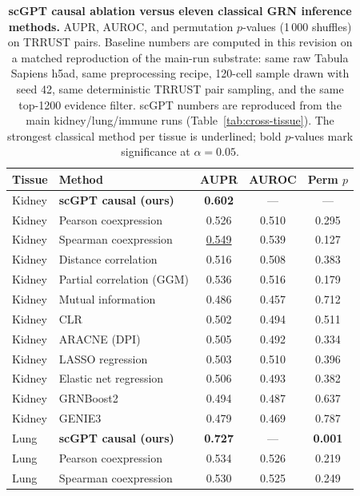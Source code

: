 \documentclass[10pt,letterpaper]{article}
\begin{document}
\begin{table}[!ht]
\centering
\caption{{\bf scGPT causal ablation versus eleven classical GRN inference
methods.}
AUPR, AUROC, and permutation $p$-values (1\,000 shuffles) on TRRUST
pairs. Baseline numbers are computed in this revision on a matched
reproduction of the main-run substrate: same raw Tabula Sapiens h5ad,
same preprocessing recipe, 120-cell sample drawn with seed 42, same
deterministic TRRUST pair sampling, and the same top-1200 evidence
filter. scGPT numbers are reproduced from the main kidney/lung/immune
runs (Table~\ref{tab:cross-tissue}). The strongest classical method per
tissue is underlined; bold $p$-values mark significance at
$\alpha{=}0.05$.}
\label{tab:grn-baselines}
\begin{tabular}{llccc}
\toprule
\textbf{Tissue} & \textbf{Method} & \textbf{AUPR} & \textbf{AUROC} & \textbf{Perm $p$} \\
\midrule
Kidney & \textbf{scGPT causal (ours)}     & \textbf{0.602} & ---   & ---   \\
Kidney & Pearson coexpression             & 0.526 & 0.510 & 0.295 \\
Kidney & Spearman coexpression            & \underline{0.549} & 0.539 & 0.127 \\
Kidney & Distance correlation             & 0.516 & 0.508 & 0.383 \\
Kidney & Partial correlation (GGM)        & 0.536 & 0.516 & 0.179 \\
Kidney & Mutual information               & 0.486 & 0.457 & 0.712 \\
Kidney & CLR                              & 0.502 & 0.494 & 0.511 \\
Kidney & ARACNE (DPI)                     & 0.505 & 0.492 & 0.334 \\
Kidney & LASSO regression                 & 0.503 & 0.510 & 0.396 \\
Kidney & Elastic net regression           & 0.506 & 0.493 & 0.382 \\
Kidney & GRNBoost2                        & 0.494 & 0.487 & 0.637 \\
Kidney & GENIE3                           & 0.479 & 0.469 & 0.787 \\
\midrule
Lung   & \textbf{scGPT causal (ours)}     & \textbf{0.727} & ---   & \textbf{0.001} \\
Lung   & Pearson coexpression             & 0.534 & 0.526 & 0.219 \\
Lung   & Spearman coexpression            & 0.530 & 0.525 & 0.249 \\

\end{tabular}
\end{table}
\end{document}

